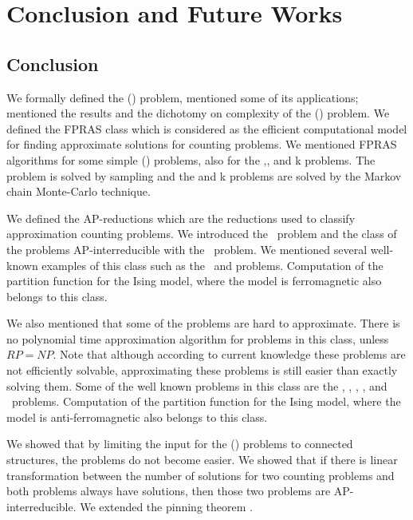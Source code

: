 \chapter{Conclusion and Future Works}
\section{Conclusion}
We formally defined the \ccsp(\mrelset) problem, mentioned some of its applications; mentioned the 
results and the dichotomy on complexity of the \ccsp(\mrelset) problem. We defined the
FPRAS class which is considered as the efficient computational model for finding approximate solutions
for counting problems.
We mentioned FPRAS algorithms for some simple \ccsp(\mrelset) problems, also 
for the ,, and k problems.
The  problem is solved by sampling and the  and k problems are solved by the Markov chain Monte-Carlo technique. 

We defined the AP-reductions which are the reductions used to classify approximation
counting problems.
We introduced the \cbis\ problem and the class of the problems AP-interreducible with the \cbis\ problem.
We mentioned several well-known examples of this class such as
the \cds\ and  problems. Computation of the partition function for 
the Ising model, where the model is ferromagnetic also belongs to this class.

We also mentioned that some of the problems are hard to approximate. There is
no polynomial time approximation algorithm for problems in this class, unless \(RP=NP\)\@.
Note that although according to current knowledge these problems are not efficiently solvable,
approximating these problems is still easier than exactly solving them.
Some of the well known problems in this 
class are the \cdsat, \ctsat, \csat, \cis, and \ctcol\ problems. Computation of the partition function for 
the Ising model, where the model is anti-ferromagnetic also belongs to this class.

We showed that by limiting the input for the \ccsp(\mrelset) problems to connected structures,
the problems do not become easier. We showed that if there is linear transformation 
between the number of solutions for two counting problems and 
both problems always have solutions, then those two problems are AP-interreducible.
We extended the pinning 
theorem \cite{Trichotomy}\@. 

